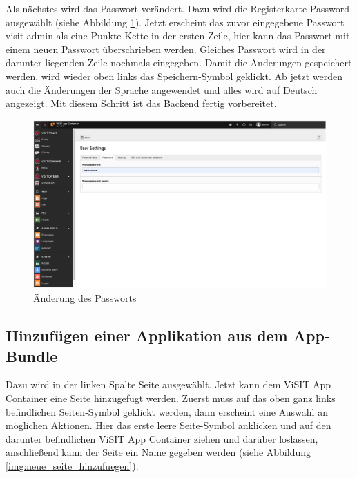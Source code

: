 Als nächstes wird das Passwort verändert. Dazu wird die Registerkarte \glqq Password\grqq{} ausgewählt (siehe Abbildung \ref{img:aenderung_passwort}). Jetzt erscheint das zuvor eingegebene Passwort \glqq visit-admin\grqq{} als eine Punkte-Kette in der ersten Zeile, hier kann das Passwort mit einem neuen Passwort überschrieben werden. Gleiches Passwort wird in der darunter liegenden Zeile nochmals eingegeben. Damit die Änderungen gespeichert werden, wird wieder oben links das Speichern-Symbol geklickt. Ab jetzt werden auch die Änderungen der Sprache angewendet und alles wird auf Deutsch angezeigt. Mit diesem Schritt ist das Backend fertig vorbereitet.

\begin{figure}[ht!]
\centering
\includegraphics[width=12cm]{Figures/paula/typo3/aenderung_passwort.png}
\caption{Änderung des Passworts}
\label{img:aenderung_passwort}
\end{figure}

\subsection{Hinzufügen einer Applikation aus dem App-Bundle}

Dazu wird in der linken Spalte \glqq Seite\grqq{} ausgewählt. Jetzt kann dem ViSIT App Container eine Seite hinzugefügt werden. Zuerst muss auf das oben ganz links befindlichen Seiten-Symbol geklickt werden, dann erscheint eine Auswahl an möglichen Aktionen. Hier das erste leere Seite-Symbol anklicken und auf den darunter befindlichen ViSIT App Container ziehen und darüber loslassen, anschließend kann der Seite ein Name gegeben werden (siehe Abbildung \ref{img:neue_seite_hinzufuegen}).

